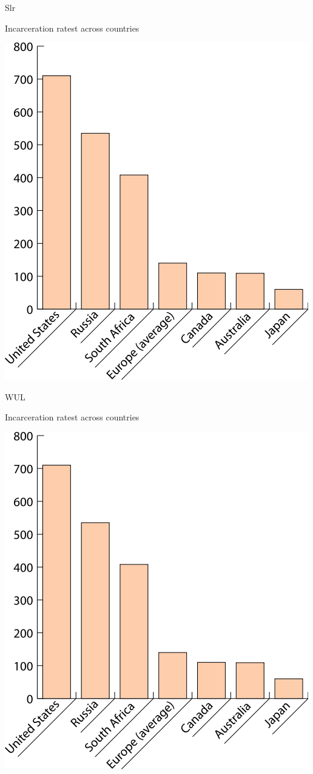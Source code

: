 \begin{chart}{S}{lr}
\caption{Incarceration ratest across countries}
\label{chart:incarceration}
\includegraphics[width=\chartwidth,height=\chartheight]{incarceration}  
\end{chart}

\begin{chart}{W}{UL}
\caption{Incarceration ratest across countries}
\label{chart:incarceration}
\includegraphics[width=\chartwidth,height=\chartheight]{incarceration}  
\end{chart}

